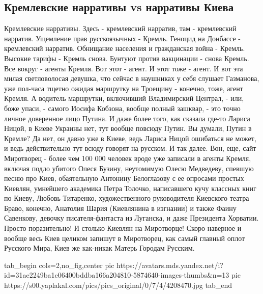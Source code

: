  
 
 
 
 

\subsection{Кремлевские нарративы vs нарративы Киева}

Кремлевские нарративы. Здесь - кремлевский нарратив, там - кремлевский
нарратив. Ущемление прав русскоязычных - Кремль. Геноцид на Донбассе -
кремлевский нарратив. Обнищание населения и гражданская война - Кремль. Высокие
тарифы - Кремль снова. Бунтуют против вакцинации - снова Кремль.  Все вокруг -
агенты Кремля. Вот этот - агент. И этот тоже - агент. И вот эта милая
светловолосая девушка, что сейчас в наушниках у себя слушает Газманова, уже
пол-часа тщетно ожидая маршрутку на Троещину - конечно, тоже, агент Кремля. А
водитель маршрутки, включивший Владимирский Централ, - или, боже упаси, -
самого Иосифа Кобзона, вообще полный зашквар, - это точно личное доверенное
лицо Путина. И даже более того, как сказала где-то Лариса Ницой, в Киеве
Украины нет, тут вообще повсюду Путин. Вы думали, Путин в Кремле? Да нет, он
давно уже в Киеве, ведь Лариса Ницой ошибаться не может, и ведь действительно
тут всюду говорят на русском. И так далее. Вон, еще, сайт Миротворец - более
чем 100 000  человек вроде уже записали в агенты Кремля, включая подло убитого
Олеся Бузину, неутомимую Олесю Медведеву, спевшую песню про Киев, обаятельную
Антонину Белоглазову с ее опросами простых Киевлян, умнейшего академика Петра
Толочко, написавшего кучу классных книг по Киеву, Любовь Титаренко,
художественного руководителя Киевского театра Браво, конечно, Анатолия Шария
(Киевлянина в изгнании) и также Фаину Савенкову, девочку писателя-фантаста из
Луганска, и даже Президента Хорватии. Просто поразительно! И столько Киевлян на
Миротворце! Скоро наверное и вообще весь Киев целиком запишут в Миротворец, как
самый главный оплот Русского Мира, Киев же как-никак Матерь Городам Русским.

\ifcmt
  tab_begin cols=2,no_fig,center
     pic https://avatars.mds.yandex.net/i?id=31ae2249ba1e06400bddba166a204810-5874640-images-thumbs&n=13
		 pic https://s00.yaplakal.com/pics/pics_original/0/7/4/4208470.jpg
  tab_end
\fi

